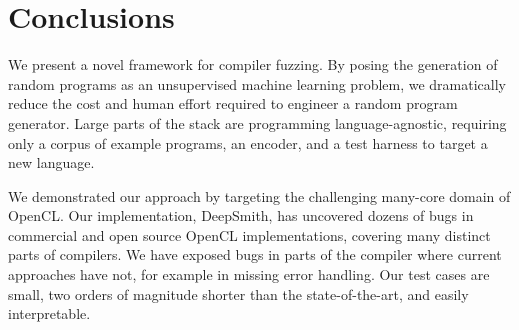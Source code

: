 \section{Conclusions}\label{sec:conclusion}

We present a novel framework for compiler fuzzing. By posing the generation of random programs as an unsupervised machine learning problem, we dramatically reduce the cost and human effort required to engineer a random program generator. Large parts of the stack are programming language-agnostic, requiring only a corpus of example programs, an encoder, and a test harness to target a new language.

We demonstrated our approach by targeting the challenging many-core domain of OpenCL. Our implementation, DeepSmith, has uncovered dozens of bugs in commercial and open source OpenCL implementations, covering many distinct parts of compilers. We have exposed bugs in parts of the compiler where current approaches have not, for example in missing error handling. Our test cases are small, two orders of magnitude shorter than the state-of-the-art, and easily interpretable.


